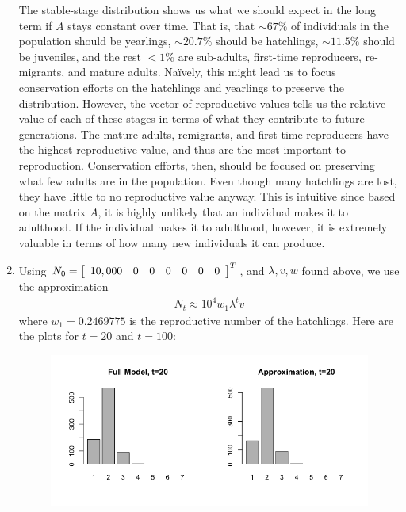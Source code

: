 \documentclass{article} %
\theoremstyle{plain}
\numberwithin{equation}{section} %
\numberwithin{figure}{section} %
\numberwithin{table}{section} %
\begin{document}
\begin{enumerate}[\ \ (a)]
        \FloatBarrier
        The stable-stage distribution shows us what we should expect in the long term if $A$ stays constant over time.  That is, that $\sim67\%$ of individuals in the population should be yearlings, $\sim20.7\%$ should be hatchlings, $\sim11.5\%$ should be juveniles, and the rest $<1\%$ are sub-adults, first-time reproducers, re-migrants, and mature adults.  Na\"{i}vely, this might lead us to focus conservation efforts on the hatchlings and yearlings to preserve the distribution.  However, the vector of reproductive values tells us the relative value of each of these stages in terms of what they contribute to future generations.  The mature adults, remigrants, and first-time reproducers have the highest reproductive value, and thus are the most important to reproduction.  Conservation efforts, then, should be focused on preserving what few adults are in the population.  Even though many hatchlings are lost, they have little to no reproductive value anyway.  This is intuitive since based on the matrix $A$, it is highly unlikely that an individual makes it to adulthood.  If the individual makes it to adulthood, however, it is extremely valuable in terms of how many new individuals it can produce.
    \item
        Using $N_0 = \qty[\begin{array}{ccccccc} 10,000 & 0 & 0 & 0 & 0 & 0 & 0\end{array}]^T$, and $\lambda,v,w$ found above, we use the approximation
        \begin{align*}
            N_t \approx 10^4w_1\lambda^{t}v
        \end{align*}
        where $w_1=0.2469775$ is the reproductive number of the hatchlings.  Here are the plots for $t=20$ and $t=100$:
        \begin{figure}[ht!]
            \centering
            \includegraphics[scale=0.4]{figure_1c.png}
        \end{figure}

\end{enumerate}
\end{document}
